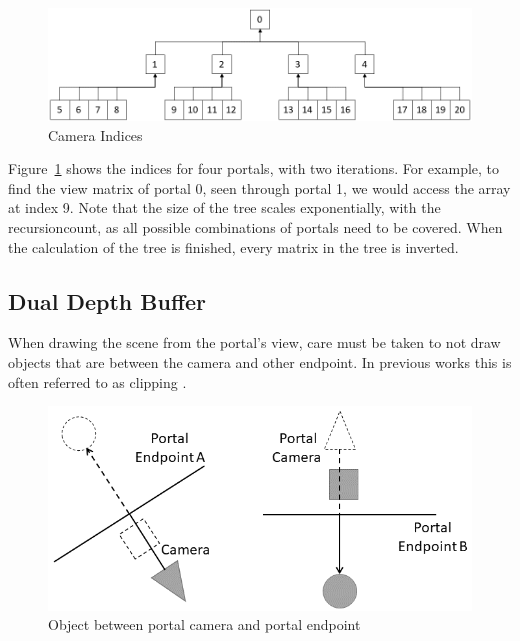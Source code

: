 
\begin{figure}[h]
	\includegraphics[width=\linewidth]{images/cameraindices.png}
	\caption{Camera Indices}
	\label{fig:cameraindices}
\end{figure}

Figure~\ref{fig:cameraindices} shows the indices for four portals, with two iterations. For example, to find the view matrix of portal 0, seen through portal 1, we would access the array at index 9. Note that the size of the tree scales exponentially, with the \gls{recursioncount}, as all possible combinations of portals need to be covered. When the calculation of the tree is finished, every matrix in the tree is inverted.


\subsection{Dual Depth Buffer}

When drawing the scene from the portal's view, care must be taken to not draw objects that are between the camera and other endpoint. In previous works this is often referred to as clipping \cite{lowe:2005:technique}.
\begin{figure}[h]
	\includegraphics[width=\linewidth]{images/bananajuce.png}
	\caption{Object between portal camera and portal endpoint}
	\label{fig:bananajuce}
\end{figure}

